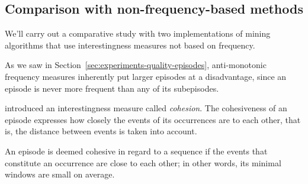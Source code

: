 \subsection{Comparison with non-frequency-based methods}

We'll carry out a comparative study with two implementations of mining algorithms that use interestingness measures not based on frequency.


As we saw in Section~\ref{sec:experiments-quality-episodes}, anti-monotonic frequency measures inherently put larger episodes at a disadvantage, since an episode is never more frequent than any of its subepisodes.
\iffalse
This has a few effects:
\begin{itemize}
\item $ (l + 1) $-episodes will generally score lower than $ l $-episodes, so larger episodes will tend to be ranked lower than smalles ones.
\item As a consequence of the preceding, and because we mine according to a fixed frequency threshold, the number of $ l $-episodes found decreases strongly as $ l $ grows.
\end{itemize}
We can clearly see the second effect if we plot the number of frequent episodes grouped by size: Figure~\ref{fig:episode-frequencies-by-size} gives the numbers for one of the experiments performed in section~\ref{sec:performance-episodes}. We do see, however, that it helps to choose thresholds as low as possible, since the number greater-than-1-episodes rises significantly near the lowest thresholds. Still, larger episodes generally won't score highly compared to their subepisodes, and so they won't do well when episodes are ranked.
\fi





\citep{cule2016efficient} introduced an interestingness measure called \emph{cohesion}. The cohesiveness of an episode expresses how closely the events of its occurrences are to each other, that is, the distance between events is taken into account.

An episode is deemed cohesive in regard to a sequence if the events that constitute an occurrence are close to each other; in other words, its minimal windows are small on average.

